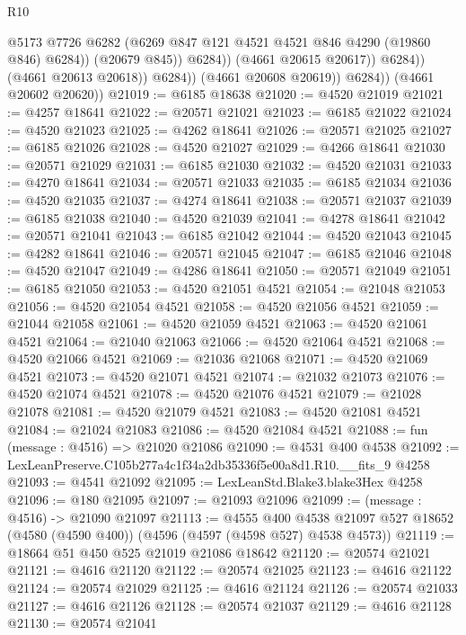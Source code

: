 \begin{lexlean}{R10}
\begin{coremodule}
                                @5173
                                @7726
                                @6282
                                (@6269 @847 @121 @4521 @4521 @846 @4290 (@19860 @846) @6284))
                              (@20679 @845))
                            @6284))
                        (@4661 @20615 @20617))
                      @6284))
                  (@4661 @20613 @20618))
                @6284))
            (@4661 @20608 @20619))
          @6284))
      (@4661 @20602 @20620))
@21019 := @6185 @18638
@21020 := @4520 @21019
@21021 := @4257 @18641
@21022 := @20571 @21021
@21023 := @6185 @21022
@21024 := @4520 @21023
@21025 := @4262 @18641
@21026 := @20571 @21025
@21027 := @6185 @21026
@21028 := @4520 @21027
@21029 := @4266 @18641
@21030 := @20571 @21029
@21031 := @6185 @21030
@21032 := @4520 @21031
@21033 := @4270 @18641
@21034 := @20571 @21033
@21035 := @6185 @21034
@21036 := @4520 @21035
@21037 := @4274 @18641
@21038 := @20571 @21037
@21039 := @6185 @21038
@21040 := @4520 @21039
@21041 := @4278 @18641
@21042 := @20571 @21041
@21043 := @6185 @21042
@21044 := @4520 @21043
@21045 := @4282 @18641
@21046 := @20571 @21045
@21047 := @6185 @21046
@21048 := @4520 @21047
@21049 := @4286 @18641
@21050 := @20571 @21049
@21051 := @6185 @21050
@21053 := @4520 @21051 @4521
@21054 := @21048 @21053
@21056 := @4520 @21054 @4521
@21058 := @4520 @21056 @4521
@21059 := @21044 @21058
@21061 := @4520 @21059 @4521
@21063 := @4520 @21061 @4521
@21064 := @21040 @21063
@21066 := @4520 @21064 @4521
@21068 := @4520 @21066 @4521
@21069 := @21036 @21068
@21071 := @4520 @21069 @4521
@21073 := @4520 @21071 @4521
@21074 := @21032 @21073
@21076 := @4520 @21074 @4521
@21078 := @4520 @21076 @4521
@21079 := @21028 @21078
@21081 := @4520 @21079 @4521
@21083 := @4520 @21081 @4521
@21084 := @21024 @21083
@21086 := @4520 @21084 @4521
@21088 := fun (message : @4516) => @21020 @21086
@21090 := @4531 @400 @4538
@21092 := LexLeanPreserve.C105b277a4c1f34a2db35336f5e00a8d1.R10.__fits_9 @4258
@21093 := @4541 @21092
@21095 := LexLeanStd.Blake3.blake3Hex @4258
@21096 := @180 @21095
@21097 := @21093 @21096
@21099 := (message : @4516) -> @21090 @21097
@21113 := @4555
    @400
    @4538
    @21097
    @527
    @18652
    (@4580 (@4590 @400))
    (@4596 (@4597 (@4598 @527) @4538 @4573))
@21119 := @18664 @51 @450 @525 @21019 @21086 @18642
@21120 := @20574 @21021
@21121 := @4616 @21120
@21122 := @20574 @21025
@21123 := @4616 @21122
@21124 := @20574 @21029
@21125 := @4616 @21124
@21126 := @20574 @21033
@21127 := @4616 @21126
@21128 := @20574 @21037
@21129 := @4616 @21128
@21130 := @20574 @21041

\end{coremodule}
\end{lexlean}
